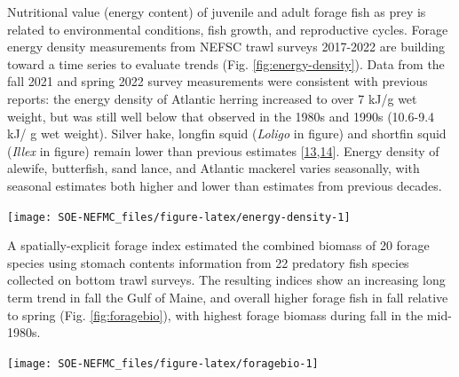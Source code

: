 \documentclass[
  10pt,
]{article}
\let\origfigure\figure
\let\endorigfigure\endfigure
\renewenvironment{figure}[1][2] {
    \expandafter\origfigure\expandafter[H]
} {
    \endorigfigure
}
\begin{document}
Nutritional value (energy content) of juvenile and adult forage fish as prey is related to environmental conditions, fish growth, and reproductive cycles. Forage energy density measurements from NEFSC trawl surveys 2017-2022 are building toward a time series to evaluate trends (Fig. \ref{fig:energy-density}). Data from the fall 2021 and spring 2022 survey measurements were consistent with previous reports: the energy density of Atlantic herring increased to over 7 kJ/g wet weight, but was still well below that observed in the 1980s and 1990s (10.6-9.4 kJ/ g wet weight). Silver hake, longfin squid (\emph{Loligo} in figure) and shortfin squid (\emph{Illex} in figure) remain lower than previous estimates {[}\protect\hyperlink{ref-steimle_energy_1985}{13},\protect\hyperlink{ref-lawson_important_1998}{14}{]}. Energy density of alewife, butterfish, sand lance, and Atlantic mackerel varies seasonally, with seasonal estimates both higher and lower than estimates from previous decades.\\

\begin{figure}

{\centering \texttt{[image: SOE-NEFMC\_files/figure-latex/energy-density-1]} 

}

\caption{Forage fish energy density mean and standard deviation by season and year, compared with 1980s (solid line; Steimle and Terranove 1985) and 1990s (dashed line; Lawson et al. 1998) values.}\label{fig:energy-density}
\end{figure}

A spatially-explicit forage index estimated the combined biomass of 20 forage species using stomach contents information from 22 predatory fish species collected on bottom trawl surveys. The resulting indices show an increasing long term trend in fall the Gulf of Maine, and overall higher forage fish in fall relative to spring (Fig. \ref{fig:foragebio}), with highest forage biomass during fall in the mid-1980s.\\

\begin{figure}

{\centering \texttt{[image: SOE-NEFMC\_files/figure-latex/foragebio-1]} 

}

\caption{Forage fish index based on spring and fall survey predator diets.}\label{fig:foragebio}
\end{figure}
\end{document}
